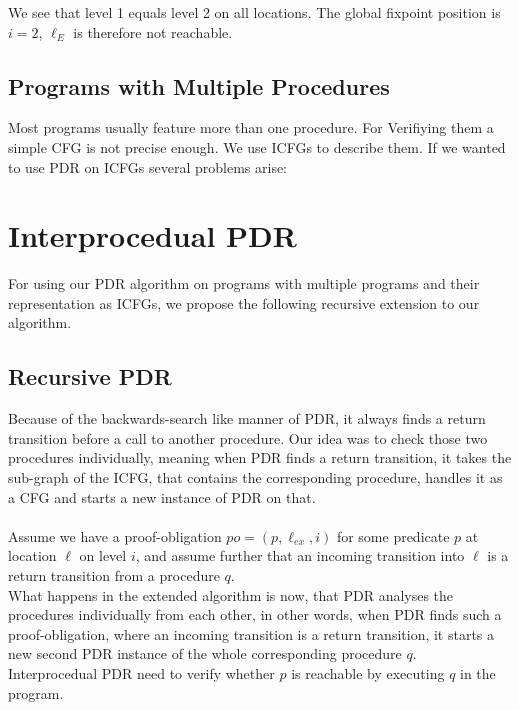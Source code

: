 \documentclass{article}
\newcommand\mycom[1]{}
\newcommand\mycom[1]{#1}
\newcommand{\jw}[1]{\mycom{\todo[color=blue!40,inline]{\small JW: #1}}}
\begin{document}
	\hspace*{5cm}
	
	We see that level 1 equals level 2 on all locations. The global fixpoint position is $i = 2$, $\ell_E$ is therefore not reachable.
	
	\subsection{Programs with Multiple Procedures}
	Most programs usually feature more than one procedure. For Verifiying them a simple CFG is not precise enough. We use ICFGs to describe them. If we wanted to use PDR on ICFGs several problems arise:
	\jw{Explain why normal PDR does not work on procedures.}
	
	\section{Interprocedual PDR}
	\jw{Rewrite this for changed global frames: Global frames are now only a map of locations to disjunction of predicates}
	For using our PDR algorithm on programs with multiple programs and their representation as ICFGs, we propose the following recursive extension to our algorithm.
	\subsection{Recursive PDR}
	Because of the backwards-search like manner of PDR, it always finds a return transition before a call to another procedure. Our idea was to check those two procedures individually, meaning when PDR finds a return transition, it takes the sub-graph of the ICFG, that contains the corresponding procedure, handles it as a CFG and starts a new instance of PDR on that. \\ \\
	Assume we have a proof-obligation $po = (p, \ell_{ex}, i)$ for some predicate $p$ at location $\ell$ on level $i$, and assume further that an incoming transition into $\ell$ is a return transition from a procedure $q$. \\
	What happens in the extended algorithm is now, that PDR analyses the procedures individually from each other, in other words, when PDR finds such a proof-obligation, where an incoming transition is a return transition, it starts a new second PDR instance of the whole corresponding procedure $q$. \\
	Interprocedual PDR need to verify whether $p$ is reachable by executing $q$ in the program. \\
	
\end{document}
